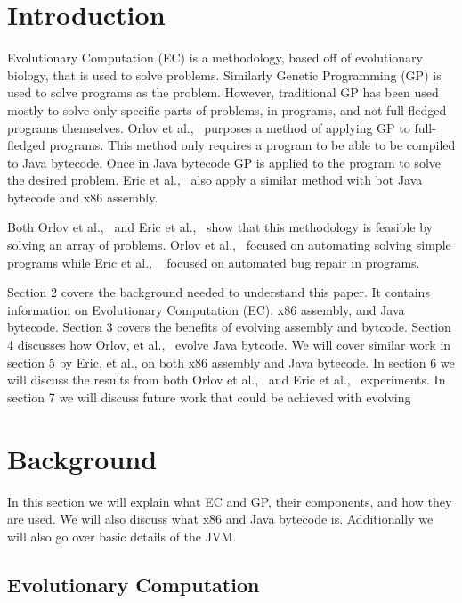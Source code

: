 \documentclass{sig-alternate}
\begin{document}

\section{Introduction}
Evolutionary Computation (EC) is a methodology, based off of evolutionary biology, that is used to solve problems. Similarly Genetic Programming (GP) is used to solve programs as the problem. However, traditional GP has been used mostly to solve only specific parts of problems, in programs, and not full-fledged programs themselves. Orlov et al.,~\cite{FINCH2:2009} purposes a method of applying GP to full-fledged programs. This method only requires a program to be able to be compiled to Java bytecode. Once in Java bytecode GP is applied to the program to solve the desired problem. Eric et al.,~\cite{Assembly:2010} also apply a similar method with bot Java bytecode and x86 assembly.\par
	Both Orlov et al.,~\cite{FINCH:2011} and Eric et al.,~\cite{Assembly:2010} show that this methodology is feasible by solving an array of problems. Orlov et al.,~\cite{FINCH2:2011} focused on automating solving simple programs while Eric et al., ~\cite{Assembly:2010} focused on automated bug repair in programs. 
	
Section 2 covers the background needed to understand this paper. It contains information on Evolutionary Computation (EC), x86 assembly, and Java bytecode. Section 3 covers the benefits of evolving assembly and bytcode. Section 4 discusses how Orlov, et al.,~\cite{FINCH:2011} evolve Java bytcode. We will cover similar work in section 5 by Eric, et al., on both x86 assembly and Java bytecode. In section 6 we will discuss the results from both Orlov et al.,~\cite{FINCH:2011} and Eric et al.,~\cite{Assembly:2010} experiments. In section 7 we will discuss future work that could be achieved with evolving 
	
	

\section{Background}
In this section we will explain what EC and GP, their components, and how they are used.
We will also discuss what x86 and Java bytecode is. Additionally we will also go over basic details of the JVM.
\subsection{Evolutionary Computation}
\end{document}
